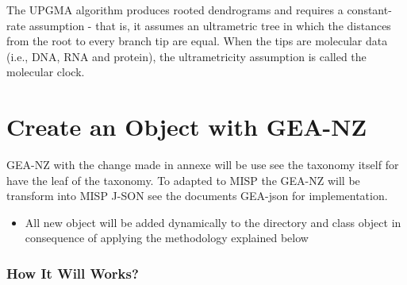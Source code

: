 \documentclass[12pt]{report}
\begin{document}
The UPGMA algorithm produces rooted dendrograms and requires a constant-rate assumption - that is, it assumes an ultrametric tree in which the distances from the root to every branch tip are equal. When the tips are molecular data (i.e., DNA, RNA and protein), the ultrametricity assumption is called the molecular clock.

\newpage

\section*{Create an Object with GEA-NZ}

GEA-NZ with the change made in annexe will be use see the taxonomy itself for have the leaf of the taxonomy. To adapted to MISP the GEA-NZ will be transform into MISP J-SON see the documents GEA-json for implementation.

\begin{itemize}
\item All new object will be added dynamically to the directory and class object in consequence of applying the methodology explained below
\end{itemize}



\subsubsection*{How It Will Works?}
\end{document}
